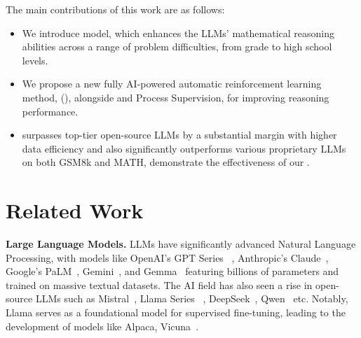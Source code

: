 The main contributions of this work are as follows:

\begin{itemize}
\item We introduce \modelname{} model, which enhances the LLMs' mathematical reasoning abilities across a range of problem difficulties, from grade to high school levels.
\item We propose a new fully AI-powered automatic reinforcement learning method,  \REInameF{} (\textbf{\REInameS{}}), alongside \MathEIname{} and Process Supervision, for improving reasoning performance. 
\item \modelname{} surpasses top-tier open-source LLMs by a substantial margin with higher data efficiency and also significantly outperforms various proprietary LLMs on both GSM8k and MATH, demonstrate the effectiveness of our \textbf{\REInameS{}}.
\end{itemize}

\section{Related Work}

\textbf{Large Language Models.} LLMs have significantly advanced Natural Language Processing, with models like OpenAI's GPT Series ~\citep{GPT3,openai2023gpt4}, Anthropic's Claude~\citep{bai2022constitutional-claude}, Google's PaLM~\citep{PaLM,palm2}, Gemini~\citep{geminiteam2023gemini}, and Gemma~\citep{team2024gemma} featuring billions of parameters and trained on massive textual datasets. The AI field has also seen a rise in open-source LLMs such as Mistral~\citep{jiang2023mistral}, Llama Series ~\citep{touvron2023llama,touvron2023llama2, dubey2024-llama3, taylor2022galactica},  DeepSeek~\citep{Bi2024DeepSeekLS, shao2024-deepseekmath}, Qwen~\citep{Bai2023QwenTR, yang2024-qwen2.5-math} etc. Notably, Llama serves as a foundational model for supervised fine-tuning, leading to the development of models like Alpaca, Vicuna~\citep{alpaca,vicuna2023}.

